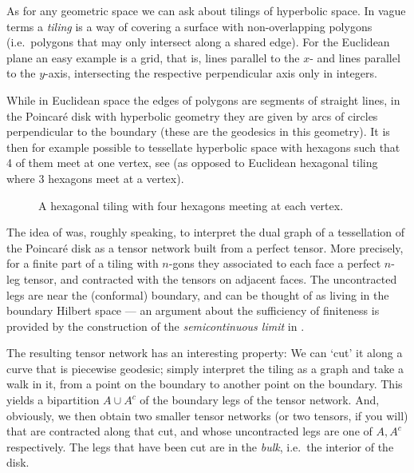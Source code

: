 As for any geometric space we can ask about tilings of hyperbolic space. In vague terms a \emph{tiling} is a way of covering a surface with non-overlapping polygons (i.e.\ polygons that may only intersect along a shared edge). For the Euclidean plane an easy example is a grid, that is, lines parallel to the $x$- and lines parallel to the $y$-axis, intersecting the respective perpendicular axis only in integers.

While in Euclidean space the edges of polygons are segments of straight lines, in the Poincar\'e disk with hyperbolic geometry they are given by arcs of circles perpendicular to the boundary (these are the geodesics in this geometry). It is then for example possible to tessellate hyperbolic space with hexagons such that 4 of them meet at one vertex, see  (as opposed to Euclidean hexagonal tiling where 3 hexagons meet at a vertex).

\begin{figure}[!htp]\centering
	
	\caption[A $\{6,4\}$-tiling of the Poincar\'e disk. This image was created using the tiling tool on \url{malinc.se/m/ImageTiling.php} (creative commons), then turned into an ${}^*$.svg using Inkscape.]{A hexagonal tiling with four hexagons meeting at each vertex. }\label{fig:HexagonalTiling}
\end{figure}

The idea of \cite{Pastawski2015Holographic} was, roughly speaking, to interpret the dual graph of a tessellation of the Poincar\'e disk as a tensor network built from a perfect tensor. More precisely, for a finite part of a tiling with $n$-gons they associated to each face a perfect $n$-leg tensor, and contracted with the tensors on adjacent faces. The uncontracted legs are near the (conformal) boundary, and can be thought of as living in the boundary Hilbert space --- an argument about the sufficiency of finiteness is provided by the construction of the \emph{semicontinuous limit} in \cite{Osborne:2017woa}.

\bigno The resulting tensor network has an interesting property: We can `cut' it along a curve that is piecewise geodesic; simply interpret the tiling as a graph and take a walk in it, from a point on the boundary to another point on the boundary. This yields a bipartition $A\cup A^c$ of the boundary legs of the tensor network. And, obviously, we then obtain two smaller tensor networks (or two tensors, if you will) that are contracted along that cut, and whose uncontracted legs are one of $A,A^c$ respectively.
 The legs that have been cut are in the \emph{bulk}, i.e.\ the interior of the disk. 

